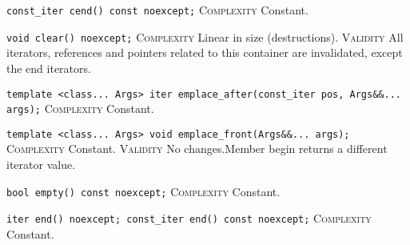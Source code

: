 \noindent{}\hspace*{0.25em}\lstinline[basicstyle=\ttfamily\color{cgreen}]{const_iter cend() const noexcept;} \textsc{Complexity} Constant.\\\vspace{-0.6em}

\noindent{}\hspace*{0.25em}\lstinline[basicstyle=\ttfamily\color{corange}]{void clear() noexcept;} \textsc{Complexity} Linear in size (destructions). \textsc{Validity} All iterators, references and pointers related to this container are invalidated, except the end iterators.\\\vspace{-0.6em}

\noindent{}\hspace*{0.25em}\lstinline[basicstyle=\ttfamily\color{cgreen}]{template <class... Args> iter emplace_after(const_iter pos, Args&&... args);} \textsc{Complexity} Constant.\\\vspace{-0.6em}

\noindent{}\hspace*{0.25em}\lstinline[basicstyle=\ttfamily\color{cgreen}]{template <class... Args> void emplace_front(Args&&... args);} \textsc{Complexity} Constant. \textsc{Validity} No changes.Member begin returns a different iterator value.\\\vspace{-0.6em}

\noindent{}\hspace*{0.25em}\lstinline[basicstyle=\ttfamily\color{cgreen}]{bool empty() const noexcept;} \textsc{Complexity} Constant.\\\vspace{-0.6em}

\noindent{}\hspace*{0.25em}\lstinline[basicstyle=\ttfamily\color{cgreen}]{iter end() noexcept; const_iter end() const noexcept;} \textsc{Complexity} Constant.\\\vspace{-0.6em}

